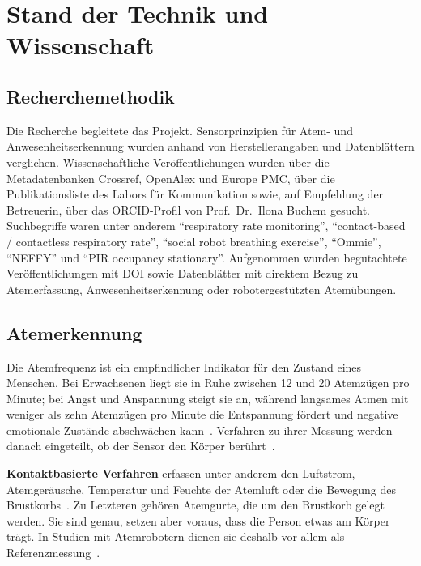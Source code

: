\chapter{Stand der Technik und Wissenschaft}
\label{kap:stand}

\section{Recherchemethodik}
\label{sec:recherche}

Die Recherche begleitete das Projekt. Sensorprinzipien für Atem- und Anwesenheitserkennung
wurden anhand von Herstellerangaben und Datenblättern verglichen. Wissenschaftliche
Veröffentlichungen wurden über die Metadatenbanken Crossref, OpenAlex und Europe PMC, über die
Publikationsliste des Labors für Kommunikation sowie, auf Empfehlung der Betreuerin, über
das ORCID-Profil von Prof.\ Dr.\ Ilona Buchem gesucht. Suchbegriffe waren unter anderem
\enquote{respiratory rate monitoring}, \enquote{contact-based / contactless respiratory
rate}, \enquote{social robot breathing exercise}, \enquote{Ommie}, \enquote{NEFFY} und
\enquote{PIR occupancy stationary}. Aufgenommen wurden begutachtete Veröffentlichungen mit
DOI sowie Datenblätter mit direktem Bezug zu Atemerfassung, Anwesenheitserkennung oder
robotergestützten Atemübungen.

\section{Atemerkennung}
\label{sec:sdt_atem}

Die Atemfrequenz ist ein empfindlicher Indikator für den Zustand eines Menschen. Bei
Erwachsenen liegt sie in Ruhe zwischen 12 und 20 Atemzügen pro Minute; bei Angst und
Anspannung steigt sie an, während langsames Atmen mit weniger als zehn Atemzügen pro Minute die
Entspannung fördert und negative emotionale Zustände abschwächen kann~\cite{nicolo2020rr,zaccaro2018slow}. Verfahren zu ihrer Messung werden danach eingeteilt,
ob der Sensor den Körper berührt~\cite{massaroni2019contact,massaroni2021contactless}.

\textbf{Kontaktbasierte Verfahren} erfassen unter anderem den Luftstrom, Atemgeräusche,
Temperatur und Feuchte der Atemluft oder die Bewegung des Brustkorbs~\cite{massaroni2019contact}.
Zu Letzteren gehören Atemgurte, die um den Brustkorb gelegt werden. Sie sind genau, setzen
aber voraus, dass die Person etwas am Körper trägt. In Studien mit Atemrobotern dienen sie
deshalb vor allem als Referenzmessung~\cite{matheus2023phase}.

